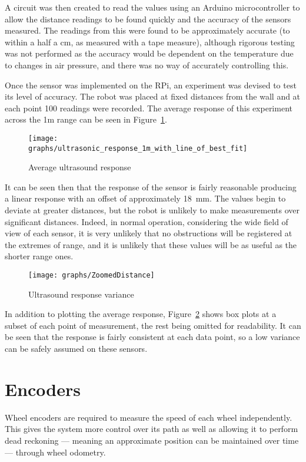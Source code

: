 A circuit was then created to read the values using an Arduino
microcontroller to allow the distance readings to be found quickly
and the accuracy of the sensors measured. The readings from this were
found to be approximately accurate (to within a half a \si{\cm},
as measured with a tape measure), although rigorous testing was not
performed as the accuracy would be dependent on the temperature due
to changes in air pressure, and there was no way of accurately controlling this.

Once the sensor was implemented on the RPi, an experiment was devised to test
its level of accuracy. The robot was placed at fixed distances from the wall
and at each point 100 readings were recorded. The average response of this
experiment across the 1m range can be seen in Figure~\ref{fig:usline}.

\begin{figure}[!ht]
	\centering
	\texttt{[image: graphs/ultrasonic\_response\_1m\_with\_line\_of\_best\_fit]}
	\caption{Average ultrasound response}\label{fig:usline}
\end{figure}

It can be seen then that the response of the sensor is fairly reasonable producing a linear response with an offset of approximately \SI{18}{\milli\meter}. The values begin to deviate at greater distances, but the robot is unlikely to make measurements over significant distances. Indeed, in normal operation, considering the wide field of view of each sensor, it is very unlikely that no obstructions will be registered at the extremes of range, and it is unlikely that these values will be as useful as the shorter range ones.

\begin{figure}[!ht]
	\centering
	\texttt{[image: graphs/ZoomedDistance]}
	\caption{Ultrasound response variance}\label{fig:usboxplots}
\end{figure}

In addition to plotting the average response, Figure~\ref{fig:usboxplots}
shows box plots at a subset of each point of measurement, the rest being
omitted for readability. It can be seen that the response is fairly
consistent at each data point, so a low variance can be safely assumed on
these sensors.

\section{Encoders}\label{elec/encoder}
Wheel encoders are required to measure the speed of each wheel
independently. This gives the system more control over its path
as well as allowing it to perform dead reckoning --- meaning an
approximate position can be maintained over time --- through wheel odometry.

